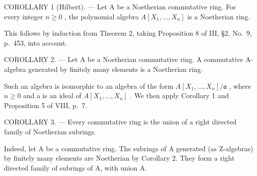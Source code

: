 COROLLARY 1 (Hilbert). --- Let A be a Noetherian commutative ring. For every integer \(n \geqslant 0\) , the polynomial algebra \(A[X_{1}, \ldots, X_{n}]\) is a Noetherian ring.

This follows by induction from Theorem 2, taking Proposition 8 of III, §2, No.~9, p.~453, into account.

COROLLARY 2. --- Let A be a Noetherian commutative ring. A commutative A-algebra generated by finitely many elements is a Noetherian ring.

Such an algebra is isomorphic to an algebra of the form \(A[X_{1},\ldots,X_{n}]/\mathfrak{a}\) , where \(n \geqslant 0\) and a is an ideal of \(A[X_{1},\ldots,X_{n}]\) . We then apply Corollary 1 and Proposition 5 of VIII, p.~7.

COROLLARY 3. --- Every commutative ring is the union of a right directed family of Noetherian subrings.

Indeed, let A be a commutative ring. The subrings of A generated (as Z-algebras) by finitely many elements are Noetherian by Corollary 2. They form a right directed family of subrings of A, with union A.

